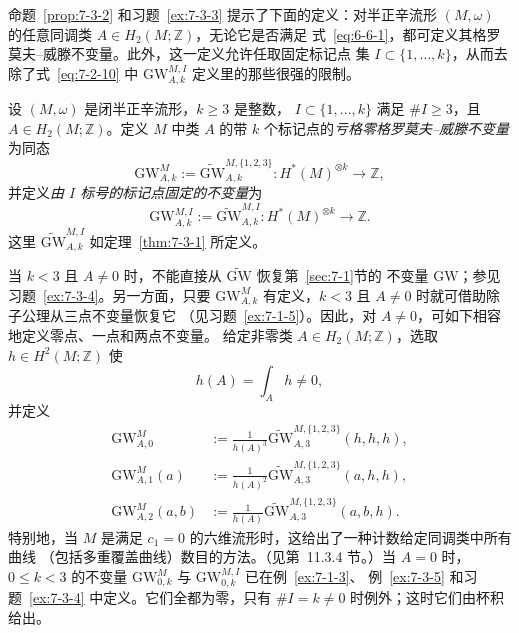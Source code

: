 命题~\ref{prop:7-3-2} 和习题~\ref{ex:7-3-3} 提示了下面的定义：对半正辛流形
$(M,\omega)$ 的任意同调类 $A\in H_2(M;\mathbb Z)$，无论它是否满足
式~\eqref{eq:6-6-1}，都可定义其格罗莫夫--威滕不变量。此外，这一定义允许任取固定标记点
集 $I\subset\{1,\ldots,k\}$，从而去除了式~\eqref{eq:7-2-10} 中
$\mathrm{GW}^{M,I}_{A,k}$ 定义里的那些很强的限制。

\begin{definition}\label{def:7-3-7}
设 $(M,\omega)$ 是闭半正辛流形，$k\ge3$ 是整数，
$I\subset\{1,\ldots,k\}$ 满足 $\#I\ge3$，且 $A\in H_2(M;\mathbb Z)$。定义 $M$ 中类
$A$ 的带 $k$ 个标记点的\emph{亏格零格罗莫夫--威滕不变量}为同态
\[
  \mathrm{GW}^M_{A,k}
  :=\widetilde{\mathrm{GW}}^{M,\{1,2,3\}}_{A,k}:
  H^*(M)^{\otimes k}\longrightarrow\mathbb Z,
\]
并定义\emph{由 $I$ 标号的标记点固定的不变量}为
\[
  \mathrm{GW}^{M,I}_{A,k}
  :=\widetilde{\mathrm{GW}}^{M,I}_{A,k}:
  H^*(M)^{\otimes k}\longrightarrow\mathbb Z.
\]
这里 $\widetilde{\mathrm{GW}}^{M,I}_{A,k}$ 如定理~\ref{thm:7-3-1} 所定义。
\end{definition}

\begin{remark}\label{rem:7-3-8}
当 $k<3$ 且 $A\ne0$ 时，不能直接从 $\widetilde{\mathrm{GW}}$ 恢复第~\ref{sec:7-1}节的
不变量 $\mathrm{GW}$；参见习题~\ref{ex:7-3-4}。另一方面，只要
$\mathrm{GW}^M_{A,k}$ 有定义，$k<3$ 且 $A\ne0$ 时就可借助除子公理从三点不变量恢复它
（见习题~\ref{ex:7-1-5}）。因此，对 $A\ne0$，可如下相容地定义零点、一点和两点不变量。
给定非零类 $A\in H_2(M;\mathbb Z)$，选取 $h\in H^2(M;\mathbb Z)$ 使
\[
  h(A)=\int_A h\ne0,
\]
并定义
\[
  \begin{aligned}
  \mathrm{GW}^M_{A,0}
  &:=\frac{1}{h(A)^3}
    \widetilde{\mathrm{GW}}^{M,\{1,2,3\}}_{A,3}(h,h,h),\\
  \mathrm{GW}^M_{A,1}(a)
  &:=\frac{1}{h(A)^2}
    \widetilde{\mathrm{GW}}^{M,\{1,2,3\}}_{A,3}(a,h,h),\\
  \mathrm{GW}^M_{A,2}(a,b)
  &:=\frac{1}{h(A)}
    \widetilde{\mathrm{GW}}^{M,\{1,2,3\}}_{A,3}(a,b,h).
  \end{aligned}
\]
特别地，当 $M$ 是满足 $c_1=0$ 的六维流形时，这给出了一种计数给定同调类中所有曲线
（包括多重覆盖曲线）数目的方法。（见第~11.3.4 节。）当 $A=0$ 时，$0\le k<3$ 的不变量
$\mathrm{GW}^M_{0,k}$ 与 $\mathrm{GW}^{M,I}_{0,k}$ 已在例~\ref{ex:7-1-3}、
例~\ref{ex:7-3-5} 和习题~\ref{ex:7-3-4} 中定义。它们全都为零，只有
$\#I=k\ne0$ 时例外；这时它们由杯积给出。
\end{remark}

